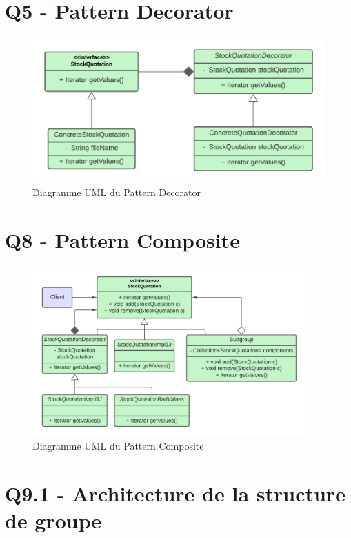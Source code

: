 \documentclass{article}
\begin{document}
\section{Q5 - Pattern Decorator}

\begin{figure}[!htb]
    \centering
    \includegraphics[width=14cm]{umls/decorator.png}
    \caption{Diagramme UML du Pattern Decorator}
    \label{fig:dec}
\end{figure}

\section{Q8 - Pattern Composite}

\begin{figure}[!htb]
    \centering
    \includegraphics[width=10.5cm]{umls/comp.png}
    \caption{Diagramme UML du Pattern Composite}
    \label{fig:comp1}
\end{figure}

\section{Q9.1 - Architecture de la structure de groupe}
\end{document}
